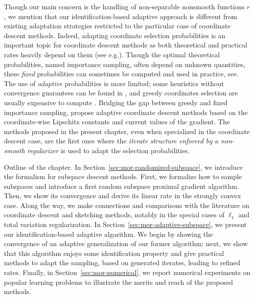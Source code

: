 Though our main concern is the handling of non-separable nonsmooth functions $r$, we mention that our identification-based adaptive approach is different from existing adaptation strategies restricted to the particular case of coordinate descent methods. Indeed, adapting coordinate selection probabilities is an important topic for coordinate descent methods as both theoretical and practical rates heavily depend on them (see e.g.\;\cite{richtarik2014iteration,necoara2014random}).
Though the optimal theoretical probabilities, named importance sampling, often depend on unknown quantities, these \emph{fixed} probabilities can sometimes be computed and used in practice, see\;\cite{zhao2015stochastic,richtarik2016optimal}.
The use of \emph{adaptive} probabilities is more limited; some heuristics without convergence guarantees can be found in \cite{loshchilov2011adaptive,glasmachers2013accelerated}, and greedy coordinates selection
are usually expensive to compute \cite{dhillon2011nearest,nutini2015coordinate,nutini2017let}. Bridging the gap between greedy and fixed importance sampling, \cite{perekrestenko2017faster,namkoong2017adaptive,stich2017safe} propose adaptive coordinate descent methods based on the coordinate-wise Lipschitz constants and current values of the gradient. 
The methods proposed in the present chapter, even when specialized in the coordinate descent case, are the first ones where the \emph{iterate structure enforced by a non-smooth regularizer} is used to adapt the selection probabilities.

{Outline of the chapter. In Section~\ref{sec:mor-randomized-subspace}, we introduce the formalism for subspace descent methods. First, we formalize how to sample subspaces and introduce a first random subspace proximal gradient algorithm. Then, we show its convergence and derive its linear rate in the strongly convex case. Along the way, we make connections and comparisons with the literature on coordinate descent and sketching methods, notably in the special cases of $\ell_1$ and total variation regularization. In Section~\ref{sec:mor-adaptive-subspace}, we present our identification-based adaptive algorithm. We begin by showing the convergence of an adaptive generalization of our former algorithm; next, we show that this algorithm enjoys some identification property and give practical methods to adapt the sampling, based on generated iterates, leading to refined rates. Finally, in Section~\ref{sec:mor-numerical}, we report numerical experiments on popular learning problems to illustrate the merits and reach of the proposed methods.
}
